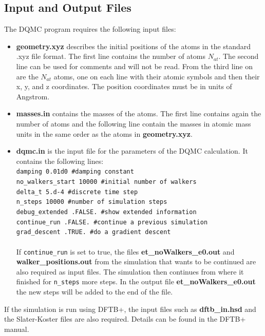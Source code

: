 \documentclass [12pt]{report}
\begin{document}
\begin{appendices}
\chapter{Input and Output Files} \label{inout}
The DQMC program requires the following input files:
\begin{itemize}
\item \textbf{geometry.xyz} describes the initial positions of the atoms in the standard .xyz file format. The first line contains the number of atoms $N_{at}$. The second line can be used for comments and will not be read. From the third line on are the $N_{at}$ atoms, one on each line with their atomic symbols and then their x, y, and z coordinates. The position coordinates must be in units of Angstrom.
\item \textbf{masses.in} contains the masses of the atoms. The first line contains again the number of atoms and the following line contain the masses in atomic mass units in the same order as the atoms in \textbf{geometry.xyz}.
\item \textbf{dqmc.in} is the input file for the parameters of the DQMC calculation. It contains the following lines:\\
\verb+damping 0.01d0 #damping constant+\\
\verb+no_walkers_start 10000 #initial number of walkers+\\
\verb+delta_t 5.d-4 #discrete time step+\\
\verb+n_steps 10000 #number of simulation steps+\\
\verb+debug_extended .FALSE. #show extended information+\\
\verb+continue_run .FALSE. #continue a previous simulation+\\
\verb+grad_descent .TRUE. #do a gradient descent+\\
\\
If \verb+continue_run+ is set to true, the files \textbf{et\_noWalkers\_e0.out} and \textbf{walker\_positions.out} from the simulation that wants to be continued are also required as input files. The simulation then continues from where it finished for \verb+n_steps+ more steps. In the output file \textbf{et\_noWalkers\_e0.out} the new steps will be added to the end of the file.
\end{itemize}
If the simulation is run using DFTB+, the input files such as \textbf{dftb\_in.hsd} and the Slater-Koster files are also required. Details can be found in the DFTB+ manual\cite{dftbp_manual}.\\


\end{appendices}
\end{document}
